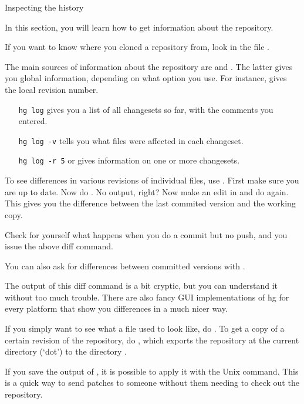  {Inspecting the history}

\begin{purpose}
  In this section, you will learn how to get information about the repository.
\end{purpose}

If you want to know where you cloned a repository from, look in the
file .

The main sources of information about the repository are 
and . The latter gives you global information, depending
on what option you use. For instance,  gives the local revision
number.
\begin{itemize}
\item [\texttt{hg log}] gives you a list of all changesets so far,
  with the comments you entered.
\item [\texttt{hg log -v}] tells you what files were affected in each changeset.
\item [\texttt{hg log -r 5}] or  gives information on
  one or more changesets.
\end{itemize}

To see differences in various revisions of individual files, use
. First 
make sure you are up to date. Now do . No
output, right? Now make an edit in  and do  again. This gives you the difference between the last
commited version and the working copy.

Check for yourself what happens when you do a commit but no push, and 
you issue the above diff command.

You can also ask for differences between committed versions with
.

The output of this diff command is a bit cryptic, but you can
understand it without too much trouble. There are also fancy GUI
implementations of hg for every platform that show you differences in
a much nicer way.

If you simply want to see what a file used to look like, do . To get a copy of a certain revision of the
repository, do , which exports the
repository at the current directory (`dot') to the directory .

If you save the output of , it is possible to apply it
with the Unix  command. This is a quick way to send patches
to someone without them needing to check out the repository.

